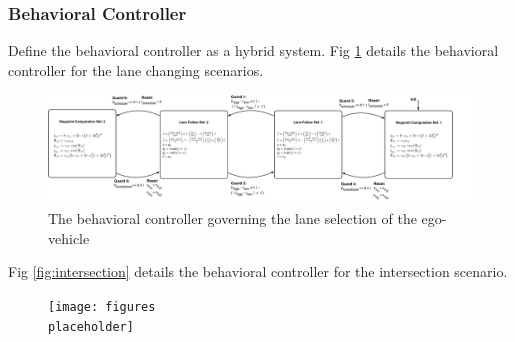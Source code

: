 \subsubsection{Behavioral Controller}
Define the behavioral controller as a hybrid system. Fig \ref{fig:lc} details the behavioral controller for the lane changing scenarios. 
\begin{figure}[h]
	\centering
	\includegraphics[width=\textwidth]{figures/arch-ego-automaton}
	\caption{The behavioral controller governing the lane selection of the ego-vehicle}
	\label{fig:lc}
\end{figure}

Fig \ref{fig:intersection} details the behavioral controller for the intersection scenario. 

\begin{figure}
	\texttt{[image: figures\\placeholder]}
\end{figure}
